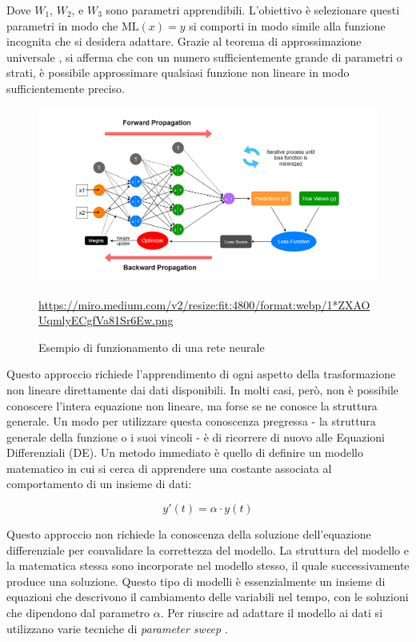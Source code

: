 Dove $W_1$, $W_2$, e $W_3$ sono parametri apprendibili. L'obiettivo è 
selezionare questi parametri in modo che $\mathrm{ML}(x) = y$ si comporti in modo 
simile alla funzione incognita che si desidera adattare. Grazie 
al teorema di approssimazione universale \cite{nishijima2021universal}, si afferma 
che con un numero sufficientemente grande di parametri o strati, è 
possibile approssimare qualsiasi funzione non lineare in modo 
sufficientemente preciso.

\begin{figure}[H]
    \begin{center}
        \includegraphics[width=\textwidth]{img/1_ZXAOUqmlyECgfVa81Sr6Ew.png}
        \caption{Esempio di funzionamento di una rete neurale}
        \url{https://miro.medium.com/v2/resize:fit:4800/format:webp/1*ZXAOUqmlyECgfVa81Sr6Ew.png}
        \label{fig:NN_example}
    \end{center}
\end{figure}

Questo approccio richiede l'apprendimento di ogni aspetto della 
trasformazione non lineare direttamente dai dati disponibili. 
In molti casi, però, non è possibile conoscere l'intera equazione non 
lineare, ma forse se ne conosce la struttura generale. Un modo per utilizzare questa conoscenza pregressa - la struttura generale della funzione o i suoi vincoli - è di ricorrere di nuovo alle Equazioni Differenziali (DE).
Un metodo immediato è quello di definire un 
modello matematico in cui si cerca di apprendere una costante associata al 
comportamento di un insieme di dati:

$$y'(t) = \alpha \cdot y(t)$$

Questo approccio non richiede la conoscenza della soluzione dell'equazione 
differenziale per convalidare la correttezza del modello. La struttura del 
modello e la matematica stessa sono incorporate nel modello stesso, il 
quale successivamente produce una soluzione. Questo tipo di modelli è 
essenzialmente un insieme di equazioni che descrivono il cambiamento 
delle variabili nel tempo, con le soluzioni che dipendono dal parametro $\alpha$. Per riuscire ad adattare il modello ai dati si utilizzano varie tecniche di \emph{parameter sweep} \cite{FITZPATRICK201879}.

